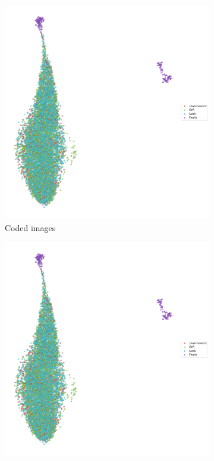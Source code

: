 \begin{figure}[h!]
    \centering
    \begin{subfigure}[h!]{0.45\textwidth}
        \includegraphics[width=\textwidth]{dissertation/figures/CK19_baseline_visualisation.png}
        \caption{Coded images}
    \end{subfigure}
    \begin{subfigure}[h!]{0.45\textwidth}
        \includegraphics[width=\textwidth]{dissertation/figures/CK19_baseline_visualisation.png}

\end{subfigure}
\end{figure}
